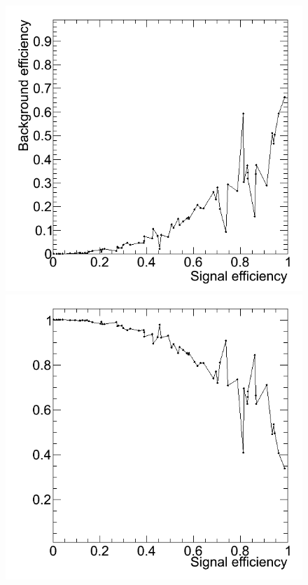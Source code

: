 \begin{figure}[h]
  \begin{center}
    \begin{minipage}{.3\textwidth}
      \includegraphics[width=\textwidth]{images/mk_cuts-eval-effBvsS}
    \end{minipage}
    \hspace{.02\textwidth}
    \begin{minipage}{.3\textwidth}
      \includegraphics[width=\textwidth]{images/mk_cuts-eval-rejBvsS}

\end{minipage}
\end{center}
\end{figure}

